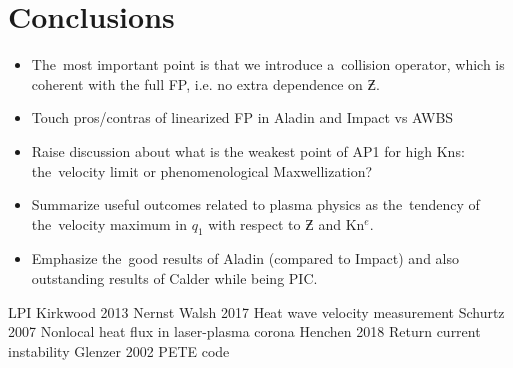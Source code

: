 \section{Conclusions}
\label{sec:Conclusions}

\begin{itemize}
  \item The~most important point is that we introduce a~collision operator, 
    which is coherent with the full FP, i.e. no extra dependence on $\Zbar$.
  \item Touch pros/contras of linearized FP in Aladin and Impact vs AWBS
  \item Raise discussion about what is the weakest point of AP1 for high Kns: 
    the~velocity limit or phenomenological Maxwellization?
  \item Summarize useful outcomes related to plasma physics as 
    the~tendency of the~velocity maximum in $q_1$ with respect to $\Zbar$ and
	Kn$^e$.
  \item Emphasize the~good results of Aladin (compared to Impact) and also
    outstanding results of Calder while being PIC. 
\end{itemize}

LPI Kirkwood 2013 \cite{Kirkwood_NIFLPI_PPCF2013}
Nernst Walsh 2017 \cite{Walsh_Nernst_PRL2017}
Heat wave velocity measurement Schurtz 2007 \cite{Schurtz_2007}
Nonlocal heat flux in laser-plasma corona Henchen 2018 \cite{Henchen_PRL2018}
Return current instability Glenzer 2002 \cite{Glenzer_PRL2002}
PETE code \cite{pete-code}
